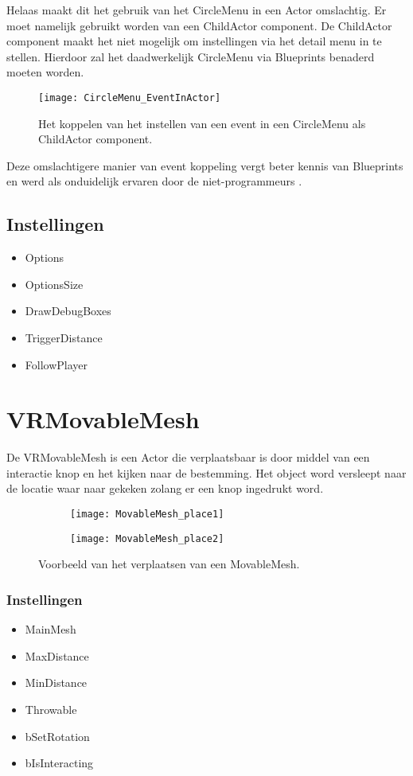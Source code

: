 Helaas maakt dit het gebruik van het CircleMenu in een Actor omslachtig. Er moet namelijk gebruikt worden van een ChildActor component. De ChildActor component maakt het niet mogelijk om instellingen via het detail menu in te stellen. Hierdoor zal het daadwerkelijk CircleMenu via Blueprints benaderd moeten worden.

\begin{figure}[H]
  \centering
    \texttt{[image: CircleMenu\_EventInActor]}
    \caption{Het koppelen van het instellen van een event in een CircleMenu als ChildActor component.}
\end{figure}

Deze omslachtigere manier van event koppeling vergt beter kennis van Blueprints en werd als onduidelijk ervaren door de niet-programmeurs . 

\subsection{Instellingen}
\begin{itemize}
	\item Options
	\item OptionsSize
	\item DrawDebugBoxes
	\item TriggerDistance
	\item FollowPlayer
\end{itemize}

\section{VRMovableMesh}
De VRMovableMesh is een Actor die verplaatsbaar is door middel van een interactie knop en het kijken naar de bestemming. Het object word versleept naar de locatie waar naar gekeken zolang er een knop ingedrukt word.


\begin{figure}[!ht]
  \centering
  	\begin{subfigure}[b]{\linewidth/3}
    	\texttt{[image: MovableMesh\_place1]}
    	\label{fig:a}
	\end{subfigure}

	\begin{subfigure}[b]{\linewidth/3}
    	\texttt{[image: MovableMesh\_place2]}
    	\label{fig:b}
	\end{subfigure}

	\caption{Voorbeeld van het verplaatsen van een MovableMesh.}
\end{figure}

\subsubsection{Instellingen}

\begin{itemize}
	\item MainMesh
	\item MaxDistance
	\item MinDistance
	\item Throwable
	\item bSetRotation
	\item bIsInteracting
\end{itemize}